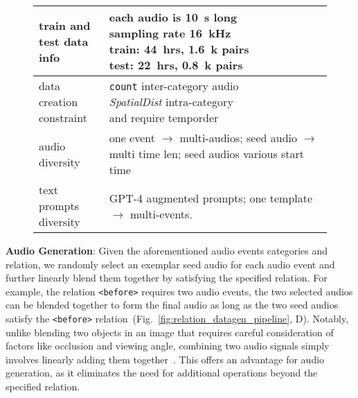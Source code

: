 \begin{figure}[t]
\begin{minipage}{0.4\textwidth}
\begin{tabular}{p{1.3cm}<{\centering}|p{3cm}<{\centering}}
        \hline
        \makecell[c]{train and \\ test data info} & \makecell[c]{each audio is 10~s long\\sampling rate 16~kHz\\
                                                                 train: 44~hrs, 1.6~k pairs\\
                                                                 test: 22~hrs, 0.8~k pairs} \\
        \hline
        \makecell[c]{data creation\\constraint} & \makecell[c]{\texttt{count} inter-category audio\\ \emph{SpatialDist} intra-category\\and require temporder}\\
        \hline
        \makecell[c]{audio\\diversity} & \makecell[c]{one event $\rightarrow$ multi-audios;\\
                                                    seed audio $\rightarrow$ multi time len;\\
                                  seed audios various start time \\}\\
        \hline
        \makecell[c]{text prompts \\diversity} & \makecell[c]{GPT-4 augmented prompts;\\
                                  one template $\rightarrow$ multi-events.}\\
        \bottomrule
        \end{tabular}
        \vspace{-2mm}
        \label{tab:ritta_datacreate}
    \end{minipage}
    \vspace{-5mm}
\end{figure}

\textbf{Audio Generation}: Given the aforementioned audio events categories and relation, we randomly select an exemplar seed audio for each audio event and further linearly blend them together by satisfying the specified relation. For example, the relation \texttt{<before>} requires two audio events, the two selected audios can be blended together to form the final audio as long as the two seed audios satisfy the \texttt{<before>} relation~(Fig.~\ref{fig:relation_datagen_pipeline}, D). Notably, unlike blending two objects in an image that requires careful consideration of factors like occlusion and viewing angle, combining two audio signals simply involves linearly adding them together~\citep{wavetheory}. This offers an advantage for audio generation, as it eliminates the need for additional operations beyond the specified relation.

